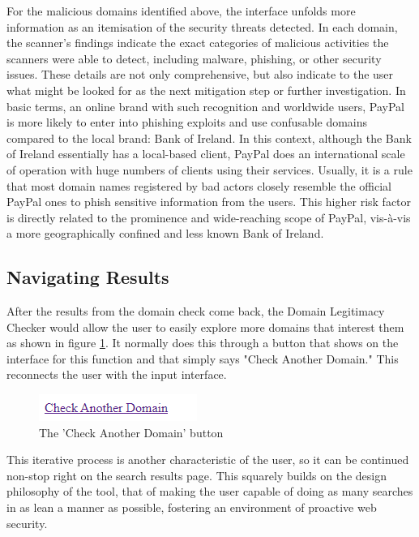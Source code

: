 For the malicious domains identified above, the interface unfolds more information as an itemisation of the security threats detected. In each domain, the scanner's findings indicate the exact categories of malicious activities the scanners were able to detect, including malware, phishing, or other security issues. These details are not only comprehensive, but also indicate to the user what might be looked for as the next mitigation step or further investigation. In basic terms, an online brand with such recognition and worldwide users, PayPal is more likely to enter into phishing exploits and use confusable domains compared to the local brand: Bank of Ireland. In this context, although the Bank of Ireland essentially has a local-based client, PayPal does an international scale of operation with huge numbers of clients using their services. Usually, it is a rule that most domain names registered by bad actors closely resemble the official PayPal ones to phish sensitive information from the users. This higher risk factor is directly related to the prominence and wide-reaching scope of PayPal, vis-à-vis a more geographically confined and less known Bank of Ireland.

\subsection{Navigating Results}

After the results from the domain check come back, the Domain Legitimacy Checker would allow the user to easily explore more domains that interest them as shown in figure \ref{fig:sss}. It normally does this through a button that shows on the interface for this function and that simply says "Check Another Domain." This reconnects the user with the input interface.

\begin{figure}[H]
    \centering
    \includegraphics[width=0.3\linewidth]{project/ii.png}
    \caption{The 'Check Another Domain' button}
    \label{fig:sss}
\end{figure}

This iterative process is another characteristic of the user, so it can be continued non-stop right on the search results page. This squarely builds on the design philosophy of the tool, that of making the user capable of doing as many searches in as lean a manner as possible, fostering an environment of proactive web security.




